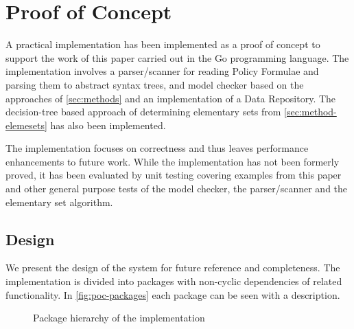 \section{Proof of Concept}\label{app:poc}
A practical implementation has been implemented as a proof of concept to support the work of this paper carried out in the Go programming language. The implementation involves a parser/scanner for reading Policy Formulae and parsing them to abstract syntax trees, and model checker based on the approaches of \ref{sec:methods} and an implementation of a Data Repository. The decision-tree based approach of determining elementary sets from \ref{sec:method-elemesets} has also been implemented.

The implementation focuses on correctness and thus leaves performance enhancements to future work. While the implementation has not been formerly proved, it has been evaluated by unit testing covering examples from this paper and other general purpose tests of the model checker, the parser/scanner and the elementary set algorithm.

\subsection{Design}
We present the design of the system for future reference and completeness. The implementation is divided into packages with non-cyclic dependencies of related functionality. In \autoref{fig:poc-packages} each package can be seen with a description.

\begin{figure}[!ht]
    \centering
    \caption{Package hierarchy of the implementation}
    \label{fig:poc-packages}
\end{figure}

